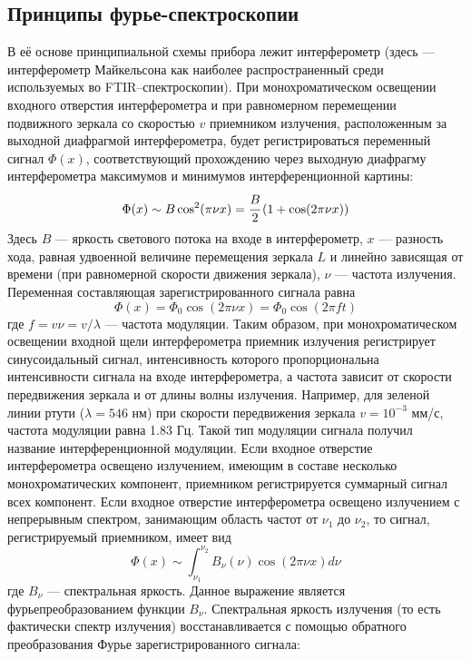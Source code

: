 \subsection{Принципы фурье-спектроскопии}
В её основе принципиальной схемы прибора лежит интерферометр
(здесь --- интерферометр Майкельсона как наиболее распространенный среди используемых во FTIR--спектроскопии). При монохроматическом освещении входного отверстия интерферометра и при равномерном перемещении подвижного зеркала со скоростью $v$ приемником излучения, расположенным за выходной диафрагмой интерферометра, будет регистрироваться переменный сигнал $\Phi(x)$, соответствующий прохождению через выходную диафрагму интерферометра максимумов и минимумов интерференционной картины:
\begin{equation}
\Phi(x) \sim B\cos^2(\pi\nu x)=\cfrac{B}{2}\,(1+\cos(2\pi\nu x))
\end{equation}
Здесь $B$ — яркость светового потока на входе в интерферометр, $x$ —
разность хода, равная удвоенной величине перемещения зеркала $L$ и
линейно зависящая от времени (при равномерной скорости движения
зеркала), $\nu$ — частота излучения. Переменная
составляющая зарегистрированного сигнала равна
\begin{equation}
\Phi(x)=\Phi_0\cos(2\pi\nu x)=\Phi_0\cos(2\pi f t)
\end{equation}
где $f = v\nu = v/\lambda$ — частота модуляции. Таким образом, при монохроматическом освещении входной щели интерферометра приемник
излучения регистрирует синусоидальный сигнал, интенсивность которого пропорциональна интенсивности сигнала на входе интерферометра, а частота зависит от скорости передвижения зеркала и от длины
волны излучения. Например, для зеленой линии ртути ($\lambda = 546$ нм)
при скорости передвижения зеркала $v = 10^{-3}$ мм/с, частота модуляции равна 1.83 Гц. Такой тип модуляции сигнала получил название интерференционной модуляции. Если входное отверстие интерферометра
освещено излучением, имеющим в составе несколько монохроматических компонент, приемником регистрируется суммарный сигнал всех
компонент. Если входное отверстие интерферометра освещено излучением с непрерывным спектром, занимающим область частот от $\nu_1$ до
$\nu_2$, то сигнал, регистрируемый приемником, имеет вид
\begin{equation}
\Phi(x)\sim\int_{\nu_1}^{\nu_2}B_{\nu}(\nu)\cos(2\pi\nu x)d\nu
\end{equation}
где $B_{\nu}$ — спектральная яркость. Данное выражение является фурьепреобразованием функции $B_{\nu}$. Спектральная яркость излучения (то есть фактически спектр излучения) восстанавливается с помощью обратного преобразования Фурье зарегистрированного сигнала:
